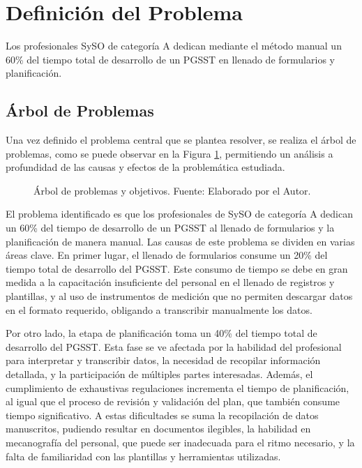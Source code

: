 
\section{Definición del Problema} 
Los profesionales SySO de categoría A dedican mediante el método manual un 60\% del tiempo total de desarrollo de un PGSST en llenado de formularios y planificación.

\subsection{Árbol de Problemas}

Una vez definido el problema central que se plantea resolver, se realiza el árbol de problemas, como se puede observar en la Figura \ref{fig:arbol_problemas}, permitiendo un análisis a profundidad de las causas y efectos de la problemática estudiada.

\begin{figure}[hb]
	\centering
	\resizebox{\textwidth}{!}{
		
	}
	\caption{Árbol de problemas y objetivos. Fuente: Elaborado por el Autor.}
	\label{fig:arbol_problemas} 
\end{figure}

El problema identificado es que los profesionales de SySO de categoría A dedican un 60\% del tiempo de desarrollo de un PGSST al llenado de formularios y la planificación de manera manual. Las causas de este problema se dividen en varias áreas clave. En primer lugar, el llenado de formularios consume un 20\% del tiempo total de desarrollo del PGSST. Este consumo de tiempo se debe en gran medida a la capacitación insuficiente del personal en el llenado de registros y plantillas, y al uso de instrumentos de medición que no permiten descargar datos en el formato requerido, obligando a transcribir manualmente los datos.

Por otro lado, la etapa de planificación toma un 40\% del tiempo total de desarrollo del PGSST. Esta fase se ve afectada por la habilidad del profesional para interpretar y transcribir datos, la necesidad de recopilar información detallada, y la participación de múltiples partes interesadas. Además, el cumplimiento de exhaustivas regulaciones incrementa el tiempo de planificación, al igual que el proceso de revisión y validación del plan, que también consume tiempo significativo. A estas dificultades se suma la recopilación de datos manuscritos, pudiendo resultar en documentos ilegibles, la habilidad en mecanografía del personal, que puede ser inadecuada para el ritmo necesario, y la falta de familiaridad con las plantillas y herramientas utilizadas.

